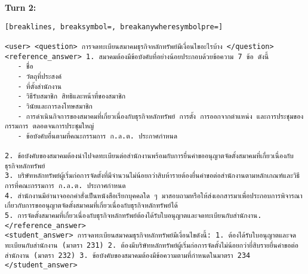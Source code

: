 \textbf{Turn 2: }
\begin{Verbatim}[breaklines, breaksymbol=, breakanywheresymbolpre=]

<user> <question> การจดทะเบียนสมาคมธุรกิจหลักทรัพย์มีเงื่อนไขอะไรบ้าง </question>
<reference_answer> 1. สมาคมต้องมีข้อบังคับที่อย่างน้อยประกอบด้วยข้อความ 7 ข้อ ดังนี้
   - ชื่อ
   - วัตถุที่ประสงค์
   - ที่ตั้งสำนักงาน
   - วิธีรับสมาชิก สิทธิและหน้าที่ของสมาชิก
   - วินัยและการลงโทษสมาชิก
   - การดำเนินกิจการของสมาคมที่เกี่ยวเนื่องกับธุรกิจหลักทรัพย์ การตั้ง การออกจากตำแหน่ง และการประชุมของกรรมการ ตลอดจนการประชุมใหญ่
   - ข้อบังคับอื่นตามที่คณะกรรมการ ก.ล.ต. ประกาศกำหนด

2. ข้อบังคับของสมาคมต้องนำไปจดทะเบียนต่อสำนักงานพร้อมกับการยื่นคำขออนุญาตจัดตั้งสมาคมที่เกี่ยวเนื่องกับธุรกิจหลักทรัพย์
3. บริษัทหลักทรัพย์ผู้เริ่มก่อการจัดตั้งที่มีจำนวนไม่น้อยกว่าสิบห้ารายต้องยื่นคำขอต่อสำนักงานตามหลักเกณฑ์และวิธีการที่คณะกรรมการ ก.ล.ต. ประกาศกำหนด
4. สำนักงานมีอำนาจออกคำสั่งเป็นหนังสือเรียกบุคคลใด ๆ มาสอบถามหรือให้ส่งเอกสารมาเพื่อประกอบการพิจารณาเกี่ยวกับการขออนุญาตจัดตั้งสมาคมที่เกี่ยวเนื่องกับธุรกิจหลักทรัพย์ได้
5. การจัดตั้งสมาคมที่เกี่ยวเนื่องกับธุรกิจหลักทรัพย์ต้องได้รับใบอนุญาตและจดทะเบียนกับสำนักงาน. </reference_answer>
<student_answer> การจดทะเบียนสมาคมธุรกิจหลักทรัพย์มีเงื่อนไขดังนี้: 1. ต้องได้รับใบอนุญาตและจดทะเบียนกับสำนักงาน (มาตรา 231) 2. ต้องมีบริษัทหลักทรัพย์ผู้เริ่มก่อการจัดตั้งไม่น้อยกว่ายี่สิบรายยื่นคำขอต่อสำนักงาน (มาตรา 232) 3. ข้อบังคับของสมาคมต้องมีข้อความตามที่กำหนดในมาตรา 234 </student_answer>


\end{Verbatim}

